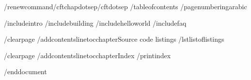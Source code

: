 	/renewcommand{/cftchapdotsep}{/cftdotsep}
	/tableofcontents
	/pagenumbering{arabic}




	/include{intro}
	/include{building}
	/include{helloworld}
	/include{faq}
	
	/clearpage
	/addcontentsline{toc}{chapter}{Source code listings}
	/lstlistoflistings

	/clearpage
	/addcontentsline{toc}{chapter}{Index}
	/printindex

	
/end{document}


